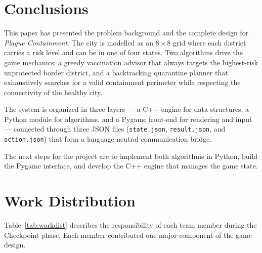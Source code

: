 \documentclass[conference]{IEEEtran}
\begin{document}
\section{Conclusions}

This paper has presented the problem background and the complete design for
\emph{Plague Containment}. The city is modelled as an $8\times8$ grid where
each district carries a risk level and can be in one of four states. Two
algorithms drive the game mechanics: a greedy vaccination advisor that always
targets the highest-risk unprotected border district, and a backtracking
quarantine planner that exhaustively searches for a valid containment perimeter
while respecting the connectivity of the healthy city.

The system is organized in three layers — a C++ engine for data structures, a
Python module for algorithms, and a Pygame front-end for rendering and input —
connected through three JSON files (\texttt{state.json}, \texttt{result.json},
and \texttt{action.json}) that form a language-neutral communication bridge.

The next steps for the project are to implement both algorithms in Python,
build the Pygame interface, and develop the C++ engine that manages the game
state.



\section{Work Distribution}

Table~\ref{tab:workdist} describes the responsibility of each team member
during the Checkpoint phase. Each member contributed one major component of the
game design.
\end{document}
